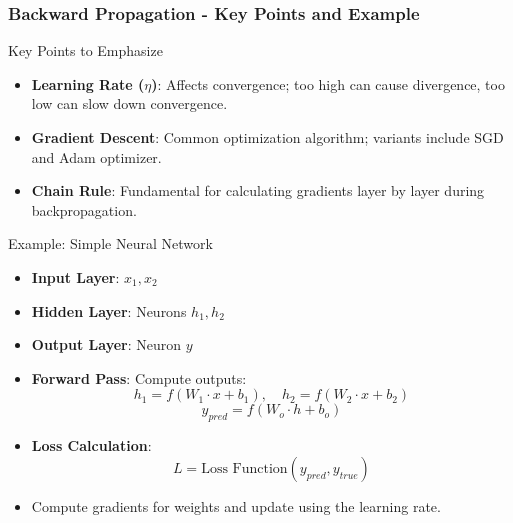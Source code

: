 \documentclass[aspectratio=169]{beamer}
\begin{document}
\begin{frame}[fragile]
    \frametitle{Backward Propagation - Key Points and Example}
    \begin{block}{Key Points to Emphasize}
        \begin{itemize}
            \item \textbf{Learning Rate (\( \eta \))}: Affects convergence; too high can cause divergence, too low can slow down convergence.
            \item \textbf{Gradient Descent}: Common optimization algorithm; variants include SGD and Adam optimizer.
            \item \textbf{Chain Rule}: Fundamental for calculating gradients layer by layer during backpropagation.
        \end{itemize}
    \end{block}

    \begin{block}{Example: Simple Neural Network}
        \begin{itemize}
            \item \textbf{Input Layer}: \( x_1, x_2 \)
            \item \textbf{Hidden Layer}: Neurons \( h_1, h_2 \)
            \item \textbf{Output Layer}: Neuron \( y \)
        \end{itemize}
        \begin{itemize}
            \item \textbf{Forward Pass}: Compute outputs: 
            \begin{equation}
                h_1 = f(W_1 \cdot x + b_1), \quad 
                h_2 = f(W_2 \cdot x + b_2)
            \end{equation}
            \begin{equation}
                y_{pred} = f(W_o \cdot h + b_o)
            \end{equation}
            \item \textbf{Loss Calculation}: 
            \begin{equation}
                L = \text{Loss Function}(y_{pred}, y_{true})
            \end{equation}
            \item Compute gradients for weights and update using the learning rate.
        \end{itemize}
    \end{block}
\end{frame}
\end{document}
